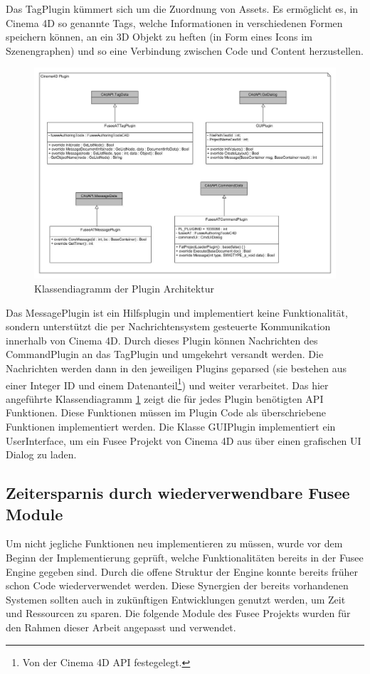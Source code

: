 \documentclass[pagesize, paper=a4, fontsize=12pt, titlepage=true, headings=small, headnosepline, abstractoff, liststotoc, nochapterprefix, plainheadsepline, twoside]{scrreprt}
\begin{document}
Das TagPlugin kümmert sich um die Zuordnung von Assets. Es ermöglicht es, in Cinema 4D so genannte Tags, welche Informationen in verschiedenen Formen speichern können, an ein 3D Objekt zu heften (in Form eines Icons im Szenengraphen) und so eine Verbindung zwischen Code und Content herzustellen.
\begin{figure}[ht]
	\centering
	\includegraphics[width=\linewidth]{Bilder/Klassendiagramm_Plugin.jpg}
	\caption{Klassendiagramm der Plugin Architektur}
	\label{KlassendiagrammPluginArchitektur}
\end{figure}
Das MessagePlugin ist ein Hilfsplugin und implementiert keine Funktionalität, sondern unterstützt die per Nachrichtensystem gesteuerte Kommunikation innerhalb von Cinema 4D. Durch dieses Plugin können Nachrichten des CommandPlugin an das TagPlugin und umgekehrt versandt werden. Die Nachrichten werden dann in den jeweiligen Plugins geparsed (sie bestehen aus einer Integer ID und einem Datenanteil\footnote{Von der Cinema 4D API festegelegt.}) und weiter verarbeitet. 
Das hier angeführte Klassendiagramm \ref{KlassendiagrammPluginArchitektur} zeigt die für jedes Plugin benötigten API Funktionen. Diese Funktionen müssen im Plugin Code als überschriebene Funktionen implementiert werden. Die Klasse GUIPlugin implementiert ein UserInterface, um ein Fusee Projekt von Cinema 4D aus über einen grafischen UI Dialog zu laden.

\subsection{Zeitersparnis durch wiederverwendbare Fusee Module}
Um nicht jegliche Funktionen neu implementieren zu müssen, wurde vor dem Beginn der Implementierung geprüft, welche Funktionalitäten bereits in der Fusee Engine gegeben sind. Durch die offene Struktur der Engine konnte bereits früher schon Code wiederverwendet werden. Diese Synergien der bereits vorhandenen Systemen sollten auch in zukünftigen Entwicklungen genutzt werden, um Zeit und Ressourcen zu sparen.
Die folgende Module des Fusee Projekts wurden für den Rahmen dieser Arbeit angepasst und verwendet.
\end{document}
